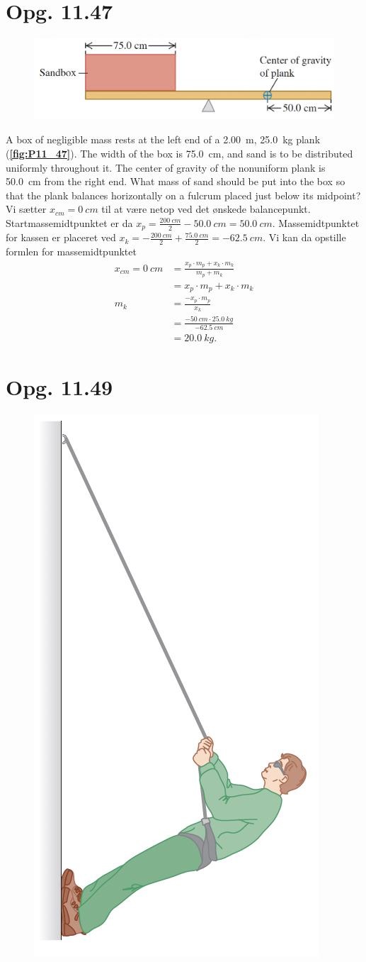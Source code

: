\documentclass[12pt]{article}
\theoremstyle{definition}
\begin{document}
\section*{Opg. 11.47}
\begin{figure} [ht]
  \centering
  \caption{}
  \includegraphics[width=0.5\linewidth]{../figures/P11_47.png}
  \label{fig:P11_47}
\end{figure}

A box of negligible mass rests at the left end of a \qty{2,00}{m}, \qty{25,0}{kg} plank (\textbf{\autoref{fig:P11_47}}). The width of the box is \qty{75,0}{cm}, and sand is to be distributed uniformly throughout it. The center of gravity of the nonuniform plank is \qty{50,0}{cm} from the right end. What mass of sand should be put into the box so that the plank balances horizontally on a fulcrum placed just below its midpoint?
\bigbreak
Vi sætter $x_{cm} = \qty{0}{cm}$ til at være netop ved det ønskede balancepunkt. Startmassemidtpunktet er da $x_p = \frac{\qty{200}{cm}}{2} - \qty{50,0}{cm} = \qty{50,0}{cm}$. Massemidtpunktet for kassen er placeret ved $x_k = - \frac{\qty{200}{cm}}{2} + \frac{\qty{75,0}{cm}}{2} = \qty{-62,5}{cm}$. Vi kan da opstille formlen for massemidtpunktet
\begin{align*}
  x_{cm} = \qty{0}{cm} &= \frac{x_p \cdot m_p + x_k \cdot m_k}{m_p + m_k} \\
  &= x_p \cdot m_p + x_k \cdot m_k \\
  m_k &= \frac{-x_p \cdot m_p}{x_k} \\
  &= \frac{- \qty{50}{cm} \cdot \qty{25,0}{kg}}{-\qty{62,5}{cm}} \\
  &= \qty{20,0}{kg}  
.\end{align*}


\section*{Opg. 11.49}
\begin{figure} [ht]
  \centering
  \caption{}
  \includegraphics[width=0.15\linewidth]{../figures/P11_49.png}
  \label{fig:P11_49}
\end{figure}
\end{document}
